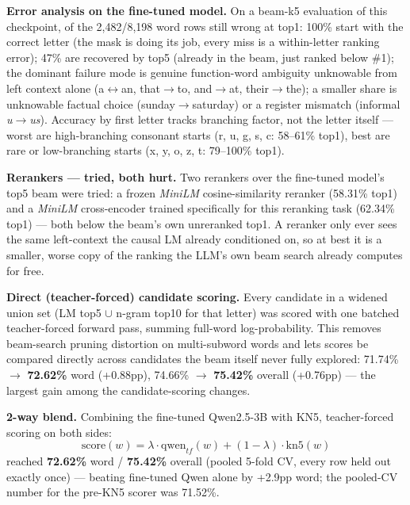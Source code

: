 \documentclass[11pt,conference]{IEEEtran}
\newcommand{\code}[1]{\textit{#1}}
\begin{document}
\textbf{Error analysis on the fine-tuned model.} On a beam-k5 evaluation of
this checkpoint, of the 2,482/8,198 word rows still wrong at top1: 100\%
start with the correct letter (the mask is doing
its job, every miss is a within-letter ranking error); 47\% are recovered by
top5 (already in the beam, just ranked below \#1); the dominant failure mode
is genuine function-word ambiguity unknowable from left context alone
(a$\leftrightarrow$an, that$\to$to, and$\to$at, their$\to$the); a smaller
share is unknowable factual choice (sunday$\to$saturday) or a register
mismatch (informal \code{u}$\to$\code{us}). Accuracy by first letter tracks
branching factor, not the letter itself --- worst are high-branching
consonant starts (r, u, g, s, c: 58--61\% top1), best are rare or
low-branching starts (x, y, o, z, t: 79--100\% top1).

\textbf{Rerankers --- tried, both hurt.} Two rerankers over the fine-tuned
model's top5 beam were tried: a frozen \code{MiniLM} cosine-similarity
reranker (58.31\% top1) and a \code{MiniLM} cross-encoder trained
specifically for this reranking task (62.34\% top1) --- both below the
beam's own unreranked top1. A reranker only ever sees the same left-context
the causal LM already conditioned on, so at best it is a smaller, worse copy
of the ranking the LLM's own beam search already computes for free.

\textbf{Direct (teacher-forced) candidate scoring.} Every candidate in a widened
union set (LM top5 $\cup$ n-gram top10 for that letter) was scored with one
batched teacher-forced forward pass, summing full-word log-probability. This
removes beam-search pruning distortion on multi-subword words and lets scores
be compared directly across candidates the beam itself never fully explored:
71.74\% $\to$ \textbf{72.62\%} word (+0.88pp), 74.66\% $\to$ \textbf{75.42\%}
overall (+0.76pp) --- the largest gain among the candidate-scoring changes.

\textbf{2-way blend.} Combining the fine-tuned Qwen2.5-3B with KN5,
teacher-forced scoring on both sides:
\begin{equation}
\text{score}(w) = \lambda \cdot \text{qwen}_{tf}(w) + (1-\lambda) \cdot \text{kn5}(w)
\label{eq:blend2}
\end{equation}
reached \textbf{72.62\%} word / \textbf{75.42\%} overall (pooled 5-fold CV,
every row held out exactly once) --- beating fine-tuned Qwen alone by
+2.9pp word; the pooled-CV number for the pre-KN5 scorer was 71.52\%.
\end{document}
